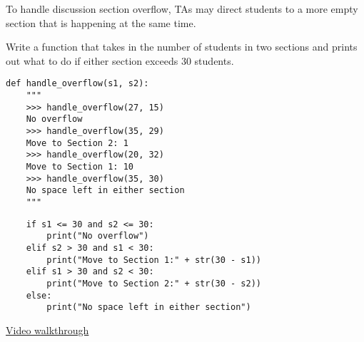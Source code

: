 \question To handle discussion section overflow, TAs may direct students
to a more empty section that is happening at the same time.

Write a function that takes in the number of students in two sections and
prints out what to do if either section exceeds 30 students.

\begin{lstlisting}
def handle_overflow(s1, s2):
    """
    >>> handle_overflow(27, 15)
    No overflow
    >>> handle_overflow(35, 29)
    Move to Section 2: 1
    >>> handle_overflow(20, 32)
    Move to Section 1: 10
    >>> handle_overflow(35, 30)
    No space left in either section
    """
\end{lstlisting}
\begin{solution}[1in]
\begin{lstlisting}
    if s1 <= 30 and s2 <= 30:
        print("No overflow")
    elif s2 > 30 and s1 < 30:
        print("Move to Section 1:" + str(30 - s1))
    elif s1 > 30 and s2 < 30:
        print("Move to Section 2:" + str(30 - s2))
    else:
        print("No space left in either section")
\end{lstlisting}
\href{https://www.youtube.com/watch?v=Fiw0f5yuQgo&vq=hd1080&t=29m19s}{Video walkthrough}
\end{solution}
